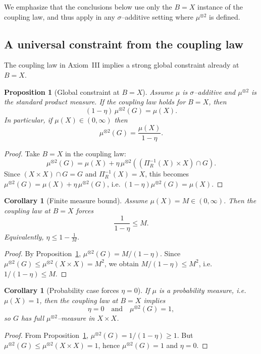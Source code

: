 \documentclass[11pt]{article}
\numberwithin{equation}{section}
\newtheorem{proposition}[theorem]{Proposition}
\newtheorem{corollary}[theorem]{Corollary}
\theoremstyle{definition}
\begin{document}
We emphasize that the conclusions below use only the $B=X$ instance of the coupling law,
and thus apply in any $\sigma$--additive setting where $\mu^{\otimes2}$ is defined.

\subsection{A universal constraint from the coupling law}
The coupling law in Axiom~III implies a strong global constraint already at $B=X$.

\begin{proposition}[Global constraint at $B=X$]\label{prop:global-constraint}
Assume $\mu$ is $\sigma$--additive and $\mu^{\otimes2}$ is the standard product measure.
If the coupling law holds for $B=X$, then
\[
(1-\eta)\,\mu^{\otimes2}(G)=\mu(X).
\]
In particular, if $\mu(X)\in(0,\infty)$ then
\[
\mu^{\otimes2}(G)=\frac{\mu(X)}{1-\eta}.
\]
\end{proposition}

\begin{proof}
Take $B=X$ in the coupling law:
\[
\mu^{\otimes2}(G)=\mu(X)+\eta\,\mu^{\otimes2}((\Pi_R^{-1}(X)\times X)\cap G).
\]
Since $(X\times X)\cap G=G$ and $\Pi_R^{-1}(X)=X$, this becomes
$\mu^{\otimes2}(G)=\mu(X)+\eta\,\mu^{\otimes2}(G)$, i.e. $(1-\eta)\mu^{\otimes2}(G)=\mu(X)$.
\end{proof}

\begin{corollary}[Finite measure bound]\label{cor:finite-measure-bound}
Assume $\mu(X)=M\in(0,\infty)$. Then the coupling law at $B=X$ forces
\[
\frac{1}{1-\eta}\le M.
\]
Equivalently, $\eta\le 1-\frac{1}{M}$.
\end{corollary}

\begin{proof}
By Proposition~\ref{prop:global-constraint}, $\mu^{\otimes2}(G)=M/(1-\eta)$.
Since $\mu^{\otimes2}(G)\le \mu^{\otimes2}(X\times X)=M^2$, we obtain $M/(1-\eta)\le M^2$, i.e. $1/(1-\eta)\le M$.
\end{proof}

\begin{corollary}[Probability case forces $\eta=0$]\label{cor:probability-forces-eta0}
If $\mu$ is a probability measure, i.e. $\mu(X)=1$, then the coupling law at $B=X$ implies
\[
\eta=0
\quad\text{and}\quad
\mu^{\otimes2}(G)=1,
\]
so $G$ has full $\mu^{\otimes2}$--measure in $X\times X$.
\end{corollary}

\begin{proof}
From Proposition~\ref{prop:global-constraint}, $\mu^{\otimes2}(G)=1/(1-\eta)\ge 1$.
But $\mu^{\otimes2}(G)\le \mu^{\otimes2}(X\times X)=1$, hence $\mu^{\otimes2}(G)=1$ and $\eta=0$.
\end{proof}
\end{document}
